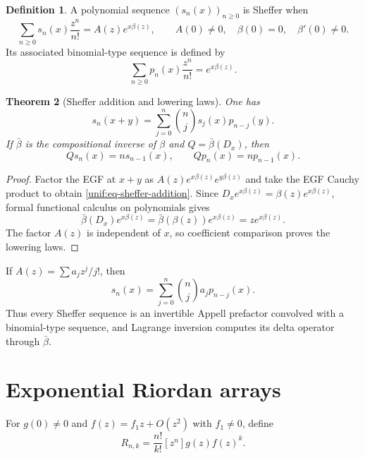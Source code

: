 \documentclass[11pt,a4paper,oneside,openany]{book}
\newtheorem{theorem}{Theorem}[chapter]
\theoremstyle{definition}
\newtheorem{definition}[theorem]{Definition}
\theoremstyle{remark}
\begin{document}
\begin{definition}
A polynomial sequence $(s_n(x))_{n\ge0}$ is Sheffer when
\begin{equation}\label{unif:eq-sheffer-egf}
 \sum_{n\ge0}s_n(x)\frac{z^n}{n!}
 =A(z)e^{x\beta(z)},
 \qquad A(0)\ne0,\quad\beta(0)=0,\quad\beta'(0)\ne0.
\end{equation}
Its associated binomial-type sequence is defined by
\begin{equation}\label{unif:eq-associated-egf}
 \sum_{n\ge0}p_n(x)\frac{z^n}{n!}=e^{x\beta(z)}.
\end{equation}
\end{definition}

\begin{theorem}[Sheffer addition and lowering laws]
\label{unif:thm-sheffer-laws}
One has
\begin{equation}\label{unif:eq-sheffer-addition}
 s_n(x+y)=\sum_{j=0}^{n}\binom nj s_j(x)p_{n-j}(y).
\end{equation}
If $\bar\beta$ is the compositional inverse of $\beta$ and
$Q=\bar\beta(D_x)$, then
\begin{equation}\label{unif:eq-sheffer-lowering}
 Qs_n(x)=ns_{n-1}(x),\qquad Qp_n(x)=np_{n-1}(x).
\end{equation}
\end{theorem}
\begin{proof}
Factor the EGF at $x+y$ as
$A(z)e^{x\beta(z)}e^{y\beta(z)}$ and take the EGF Cauchy product to obtain
\eqref{unif:eq-sheffer-addition}. Since
$D_xe^{x\beta(z)}=\beta(z)e^{x\beta(z)}$, formal functional calculus on
polynomials gives
\[
 \bar\beta(D_x)e^{x\beta(z)}=\bar\beta(\beta(z))e^{x\beta(z)}
 =ze^{x\beta(z)}.
\]
The factor $A(z)$ is independent of $x$, so coefficient comparison proves the
lowering laws.
\end{proof}

If $A(z)=\sum a_jz^j/j!$, then
\begin{equation}\label{unif:eq-sheffer-convolution}
 s_n(x)=\sum_{j=0}^{n}\binom nj a_jp_{n-j}(x).
\end{equation}
Thus every Sheffer sequence is an invertible Appell prefactor convolved with a
binomial-type sequence, and Lagrange inversion computes its delta operator
through $\bar\beta$.

\section{Exponential Riordan arrays}

For $g(0)\ne0$ and $f(z)=f_1z+O(z^2)$ with $f_1\ne0$, define
\begin{equation}\label{unif:eq-riordan-entry}
 R_{n,k}=\frac{n!}{k!}[z^n]g(z)f(z)^k.
\end{equation}
\end{document}
